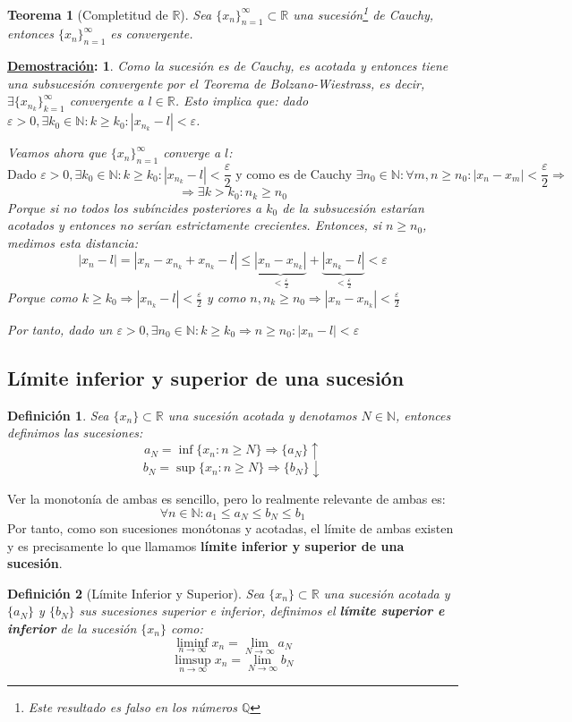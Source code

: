 \documentclass[10pt,a4paper,openright]{book}
\theoremstyle{break}
\newtheorem*{defi}{Definición}
\newtheorem*{theo}{Teorema}
\newtheorem*{demo}{\underline{Demostración}:}
\begin{document}
\begin{theo}[Completitud de $\mathbb R$]
Sea $\{x_n\}_{n=1}^\infty\subset \mathbb R$ una sucesión\footnote{Este resultado es falso en los números $\mathbb Q$} de Cauchy, entonces $\{x_n\}_{n=1}^\infty$ es convergente.
\end{theo}
\begin{demo}
Como la sucesión es de Cauchy, es acotada y entonces tiene una subsucesión convergente por el Teorema de Bolzano-Wiestrass, es decir, $\exists \{x_{n_k}\}_{k=1}^\infty$ convergente a $l\in \mathbb R$. Esto implica que: dado $\varepsilon>0, \exists k_0\in \mathbb N: k\geq k_0: |x_{n_k}-l|<\varepsilon$.\par

Veamos ahora que $\{x_n\}_{n=1}^\infty$ converge a $l$:
$$\mbox{Dado }\varepsilon>0, \exists k_0\in \mathbb N: k\geq k_0: |x_{n_k}-l|<\frac{\varepsilon}{2}\mbox{ y como es de Cauchy }\exists n_0\in\mathbb N: \forall m,n\geq n_0: |x_n-x_m|<\frac{\varepsilon}{2}\Rightarrow$$
$$\Rightarrow \exists k>k_0: n_k\geq n_0$$
Porque si no todos los subíncides posteriores a $k_0$ de la subsucesión estarían acotados y entonces no serían estrictamente crecientes.
Entonces, si $n\geq n_0$, medimos esta distancia:
$$|x_n-l|=|x_n-x_{n_k}+x_{n_k}-l|\leq \underbrace{|x_n-x_{n_k}|}_{< \frac{\varepsilon}{2}}+\underbrace{|x_{n_k}-l|}_{< \frac{\varepsilon}{2}}<\varepsilon$$
Porque como $k\geq k_0\Rightarrow |x_{n_k}-l|<\frac{\varepsilon}{2}$ y como $n,n_k\geq n_0\Rightarrow |x_n-x_{n_k}|<\frac{\varepsilon}{2}$

Por tanto, dado un $\varepsilon>0,\exists n_0\in \mathbb N: k\geq k_0\Rightarrow n\geq n_0: |x_n-l|<\varepsilon$
\end{demo}

\subsection{Límite inferior y superior de una sucesión}
\begin{defi}
Sea $\{x_n\}\subset \mathbb R$ una sucesión acotada y denotamos $N\in \mathbb N$, entonces definimos las sucesiones:
$$a_N=\inf\{x_n: n\geq N\}\Rightarrow \{a_N\}\uparrow$$
$$b_N=\sup\{x_n: n\geq N\}\Rightarrow \{b_N\}\downarrow$$
\end{defi}

Ver la monotonía de ambas es sencillo, pero lo realmente relevante de ambas es:
$$\forall n\in \mathbb N: a_1\leq a_N\leq b_N\leq b_1$$
Por tanto, como son sucesiones monótonas y acotadas, el límite de ambas existen y es precisamente lo que llamamos \textbf{límite inferior y superior de una sucesión}.
\begin{defi}[Límite Inferior y Superior]
Sea $\{x_n\}\subset \mathbb R$ una sucesión acotada y $\{a_N\}$ y $\{b_N\}$ sus sucesiones superior e inferior, definimos el \textbf{límite superior e inferior} de la sucesión $\{x_n\}$ como:
$$\liminf_{n\rightarrow\infty}x_n=\lim_{N\rightarrow\infty}a_N$$
$$\limsup_{n\rightarrow\infty}x_n=\lim_{N\rightarrow\infty}b_N$$
\end{defi}
\end{document}
